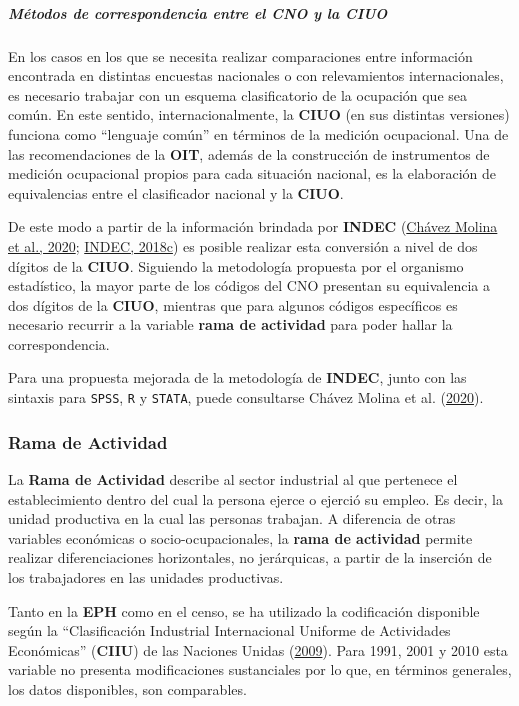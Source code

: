 \documentclass[
]{article}
\begin{document}
\hypertarget{muxe9todos-de-correspondencia-entre-el-cno-y-la-ciuo}{%
\subparagraph{Métodos de correspondencia entre el CNO y la CIUO}\label{muxe9todos-de-correspondencia-entre-el-cno-y-la-ciuo}}

En los casos en los que se necesita realizar comparaciones entre información encontrada en distintas encuestas nacionales o con relevamientos internacionales, es necesario trabajar con un esquema clasificatorio de la ocupación que sea común. En este sentido, internacionalmente, la \textbf{CIUO} (en sus distintas versiones) funciona como ``lenguaje común'' en términos de la medición ocupacional. Una de las recomendaciones de la \textbf{OIT}, además de la construcción de instrumentos de medición ocupacional propios para cada situación nacional, es la elaboración de equivalencias entre el clasificador nacional y la \textbf{CIUO}.

De este modo a partir de la información brindada por \textbf{INDEC} (\protect\hyperlink{ref-ChavezMolina.etal2020}{Chávez Molina et al., 2020}; \protect\hyperlink{ref-INDEC2018b}{INDEC, 2018c}) es posible realizar esta conversión a nivel de dos dígitos de la \textbf{CIUO}. Siguiendo la metodología propuesta por el organismo estadístico, la mayor parte de los códigos del CNO presentan su equivalencia a dos dígitos de la \textbf{CIUO}, mientras que para algunos códigos específicos es necesario recurrir a la variable \textbf{rama de actividad} para poder hallar la correspondencia.

Para una propuesta mejorada de la metodología de \textbf{INDEC}, junto con las sintaxis para \texttt{SPSS}, \texttt{R} y \texttt{STATA}, puede consultarse Chávez Molina et al. (\protect\hyperlink{ref-ChavezMolina.etal2020}{2020}).

\hypertarget{rama-de-actividad}{%
\subsubsection{Rama de Actividad}\label{rama-de-actividad}}

La \textbf{Rama de Actividad} describe al sector industrial al que pertenece el establecimiento dentro del cual la persona ejerce o ejerció su empleo. Es decir, la unidad productiva en la cual las personas trabajan. A diferencia de otras variables económicas o socio-ocupacionales, la \textbf{rama de actividad} permite realizar diferenciaciones horizontales, no jerárquicas, a partir de la inserción de los trabajadores en las unidades productivas.

Tanto en la \textbf{EPH} como en el censo, se ha utilizado la codificación disponible según la ``Clasificación Industrial Internacional Uniforme de Actividades Económicas'' (\textbf{CIIU}) de las Naciones Unidas (\protect\hyperlink{ref-ONU2009a}{2009}). Para 1991, 2001 y 2010 esta variable no presenta modificaciones sustanciales por lo que, en términos generales, los datos disponibles, son comparables.
\end{document}
